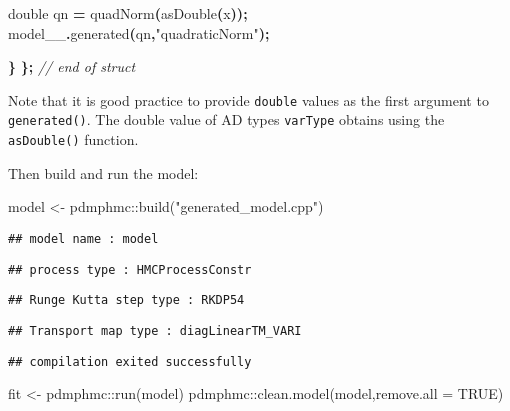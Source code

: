 \documentclass[
]{book}
\newenvironment{Shaded}{\begin{snugshade}}{\end{snugshade}}
\newcommand{\AttributeTok}[1]{\textcolor[rgb]{0.77,0.63,0.00}{#1}}
\newcommand{\CommentTok}[1]{\textcolor[rgb]{0.56,0.35,0.01}{\textit{#1}}}
\newcommand{\ConstantTok}[1]{\textcolor[rgb]{0.00,0.00,0.00}{#1}}
\newcommand{\DataTypeTok}[1]{\textcolor[rgb]{0.13,0.29,0.53}{#1}}
\newcommand{\FunctionTok}[1]{\textcolor[rgb]{0.00,0.00,0.00}{#1}}
\newcommand{\NormalTok}[1]{#1}
\newcommand{\OperatorTok}[1]{\textcolor[rgb]{0.81,0.36,0.00}{\textbf{#1}}}
\newcommand{\OtherTok}[1]{\textcolor[rgb]{0.56,0.35,0.01}{#1}}
\newcommand{\SpecialCharTok}[1]{\textcolor[rgb]{0.00,0.00,0.00}{#1}}
\newcommand{\StringTok}[1]{\textcolor[rgb]{0.31,0.60,0.02}{#1}}
\begin{document}
\begin{Shaded}
\begin{Highlighting}[]
    \DataTypeTok{double}\NormalTok{ qn }\OperatorTok{=}\NormalTok{ quadNorm}\OperatorTok{(}\NormalTok{asDouble}\OperatorTok{(}\NormalTok{x}\OperatorTok{));}
\NormalTok{    model\_\_}\OperatorTok{.}\NormalTok{generated}\OperatorTok{(}\NormalTok{qn}\OperatorTok{,}\StringTok{"quadraticNorm"}\OperatorTok{);}
    
  \OperatorTok{\}} 
\OperatorTok{\};} \CommentTok{// end of struct}
\end{Highlighting}
\end{Shaded}

Note that it is good practice to provide \texttt{double} values as the first argument to \texttt{generated()}. The double value of AD types \texttt{varType} obtains using the \texttt{asDouble()} function.

Then build and run the model:

\begin{Shaded}
\begin{Highlighting}[]
\NormalTok{model }\OtherTok{\textless{}{-}}\NormalTok{ pdmphmc}\SpecialCharTok{::}\FunctionTok{build}\NormalTok{(}\StringTok{"generated\_model.cpp"}\NormalTok{)}
\end{Highlighting}
\end{Shaded}

\begin{verbatim}
## model name : model
\end{verbatim}

\begin{verbatim}
## process type : HMCProcessConstr
\end{verbatim}

\begin{verbatim}
## Runge Kutta step type : RKDP54
\end{verbatim}

\begin{verbatim}
## Transport map type : diagLinearTM_VARI
\end{verbatim}

\begin{verbatim}
## compilation exited successfully
\end{verbatim}

\begin{Shaded}
\begin{Highlighting}[]
\NormalTok{fit }\OtherTok{\textless{}{-}}\NormalTok{ pdmphmc}\SpecialCharTok{::}\FunctionTok{run}\NormalTok{(model)}
\NormalTok{pdmphmc}\SpecialCharTok{::}\FunctionTok{clean.model}\NormalTok{(model,}\AttributeTok{remove.all =} \ConstantTok{TRUE}\NormalTok{)}
\end{Highlighting}
\end{Shaded}
\end{document}
